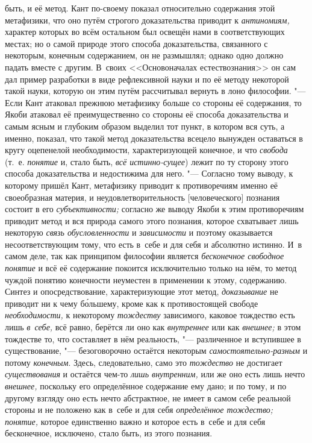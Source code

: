 быть, и её метод. Кант по-своему показал относительно содержания этой
метафизики, что оно путём строгого доказательства приводит к
{\em антиномиям,}
характер которых во всём остальном был освещён нами в
соответствующих местах; но о самой природе этого способа доказательства,
связанного с некоторым, конечным содержанием, он не размышлял; однако одно
должно падать вместе с другим. В~своих <<Основоначалах
естествознания>>
он сам дал пример разработки в виде рефлексивной науки и по
её методу некоторой такой науки, которую он этим путём рассчитывал вернуть
в лоно философии. "--- Если Кант атаковал прежнюю метафизику
больше со стороны её содержания, то Якоби атаковал её преимущественно со
стороны её способа доказательства и самым ясным и глубоким образом выделил
тот пункт, в котором вся суть, а именно, показал, что такой метод
доказательства всецело вынужден оставаться в кругу оцепенелой
необходимости, характеризующей конечное, и что {\em свобода}
(т.~е. {\em понятие} и, стало быть, {\em всё истинно-сущее})
лежит по ту сторону этого способа доказательства и
недостижима для него. "--- Согласно тому выводу, к которому
пришёл Кант, метафизику приводит к противоречиям именно её своеобразная
материя, и неудовлетворительность [человеческого] познания состоит в его
{\em субъективности;} согласно же выводу Якоби к этим противоречиям приводит
метод и вся природа самого этого познания, которое схватывает лишь некоторую
{\em связь обусловленности} и {\em зависимости}
и поэтому оказывается несоответствующим тому, что есть в~себе
и для себя и абсолютно истинно. И~в самом деле, так как принципом философии
является {\em бесконечное свободное
понятие} и всё её содержание покоится исключительно только
на нём, то метод чуждой понятию конечности неуместен в применении к этому,
содержанию. Синтез и опосредствование, характеризующие этот метод,
{\em доказывание} не
приводит ни к чему б\'{о}льшему, кроме как к противостоящей свободе
{\em необходимости,} к
некоторому {\em тождеству}
зависимого, каковое тождество есть лишь
{\em в~себе,} всё равно,
берётся ли оно как {\em внутреннее}
или как {\em внешнее;}
в этом тождестве то, что составляет в нём реальность, "---
различенное и вступившее в существование, "---
безоговорочно остаётся некоторым
{\em самостоятельно-разным}
и потому {\em конечным}.
Здесь, следовательно, само это
{\em тождество} не
достигает {\em существования}
и остаётся чем-то
{\em лишь внутренним,}
или же оно есть лишь нечто
{\em внешнее,} поскольку
его определённое содержание ему дано; и по тому, и по другому взгляду оно
есть нечто абстрактное, не имеет в самом себе реальной стороны и не
положено как в~себе и для себя
{\em определённое тождество;}
{\em понятие,} которое
единственно важно и которое есть в~себе и для себя бесконечное, исключено,
стало быть, из этого познания.

